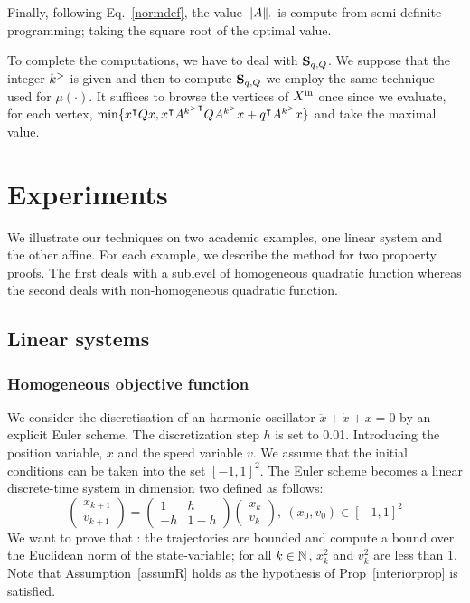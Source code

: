 \documentclass[10pt]{article}
\begin{document}
Finally, following Eq.~\eqref{normdef}, the value $\| A\|_\cdot$ is compute from semi-definite programming; taking the square root of the optimal value.

To complete the computations, we have to deal with $\mathbf{S}_{q,Q}$. We suppose that the integer $k^{>}$ is given and then to compute $\mathbf{S}_{q,Q}$ we employ the same technique used for $\mu(\cdot)$. It suffices to browse the vertices of $X^\mathrm{in}$ once since we evaluate, for each vertex, $\min\{x^\intercal Q x, x^\intercal {A^{k^{>}}}^\intercal Q {A^{k^{>}}}x+q^\intercal A^{k^{>}} x\}$ and take the maximal value. 
\section{Experiments}
\label{experiments}
We illustrate our techniques on two academic examples, one linear system and the other affine.
For each example, we describe the method for two propoerty proofs. The first deals with a sublevel of homogeneous quadratic function whereas the second deals with non-homogeneous quadratic function. 
\subsection{Linear systems}

\subsubsection{Homogeneous objective function}
\label{exp-linear}
We consider the discretisation of an harmonic oscillator $\ddot{x}+\dot{x}+x=0$ by an explicit Euler scheme. The discretization step $h$ is set to 0.01. Introducing the position variable, $x$ and the speed variable $v$. We assume that the initial conditions can be taken into the set $[-1,1]^2$. The Euler scheme becomes a linear discrete-time system in dimension two defined as follows: 
\begin{equation}
\label{harmonic}
\begin{pmatrix}
x_{k+1}\\
v_{k+1}
\end{pmatrix}
=\begin{pmatrix}
1 & h\\
-h & 1-h
\end{pmatrix}
\begin{pmatrix}
x_{k}\\
v_{k}
\end{pmatrix},\ (x_0,v_0)\in [-1,1]^2
\end{equation}
We want to prove that :
the trajectories are bounded and compute a bound over the Euclidean norm of the state-variable; for all $k\in\mathbb{N}$, $x_{k}^2$ and $v_{k}^2$ are less than 1.
Note that Assumption~\ref{assumR} holds as the hypothesis of Prop~\ref{interiorprop} is satisfied.
 
\end{document}
